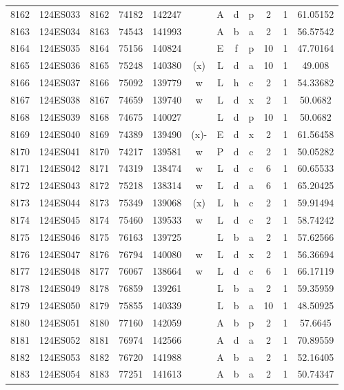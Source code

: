 \begin{tabular}{|*{12}{c|}}
8162 & 124ES033 & 8162 & 74182 & 142247 &  & A & d & p & 2 & 1 & 61.05152 \\ 
8163 & 124ES034 & 8163 & 74543 & 141993 &  & A & b & a & 2 & 1 & 56.57542 \\ 
8164 & 124ES035 & 8164 & 75156 & 140824 &  & E & f & p & 10 & 1 & 47.70164 \\ 
8165 & 124ES036 & 8165 & 75248 & 140380 & (x) & L & d & a & 10 & 1 & 49.008 \\ 
8166 & 124ES037 & 8166 & 75092 & 139779 & w & L & h & c & 2 & 1 & 54.33682 \\ 
8167 & 124ES038 & 8167 & 74659 & 139740 & w & L & d & x & 2 & 1 & 50.0682 \\ 
8168 & 124ES039 & 8168 & 74675 & 140027 &  & L & d & p & 10 & 1 & 50.0682 \\ 
8169 & 124ES040 & 8169 & 74389 & 139490 & (x)- & E & d & x & 2 & 1 & 61.56458 \\ 
8170 & 124ES041 & 8170 & 74217 & 139581 & w & P & d & c & 2 & 1 & 50.05282 \\ 
8171 & 124ES042 & 8171 & 74319 & 138474 & w & L & d & c & 6 & 1 & 60.65533 \\ 
8172 & 124ES043 & 8172 & 75218 & 138314 & w & L & d & a & 6 & 1 & 65.20425 \\ 
8173 & 124ES044 & 8173 & 75349 & 139068 & (x) & L & h & c & 2 & 1 & 59.91494 \\ 
8174 & 124ES045 & 8174 & 75460 & 139533 & w & L & d & c & 2 & 1 & 58.74242 \\ 
8175 & 124ES046 & 8175 & 76163 & 139725 &  & L & b & a & 2 & 1 & 57.62566 \\ 
8176 & 124ES047 & 8176 & 76794 & 140080 & w & L & d & x & 2 & 1 & 56.36694 \\ 
8177 & 124ES048 & 8177 & 76067 & 138664 & w & L & d & c & 6 & 1 & 66.17119 \\ 
8178 & 124ES049 & 8178 & 76859 & 139261 &  & L & b & a & 2 & 1 & 59.35959 \\ 
8179 & 124ES050 & 8179 & 75855 & 140339 &  & L & b & a & 10 & 1 & 48.50925 \\ 
8180 & 124ES051 & 8180 & 77160 & 142059 &  & A & b & p & 2 & 1 & 57.6645 \\ 
8181 & 124ES052 & 8181 & 76974 & 142566 &  & A & d & a & 2 & 1 & 70.89559 \\ 
8182 & 124ES053 & 8182 & 76720 & 141988 &  & A & b & a & 2 & 1 & 52.16405 \\ 
8183 & 124ES054 & 8183 & 77251 & 141613 &  & A & b & a & 2 & 1 & 50.74347 \\ 

\end{tabular}
